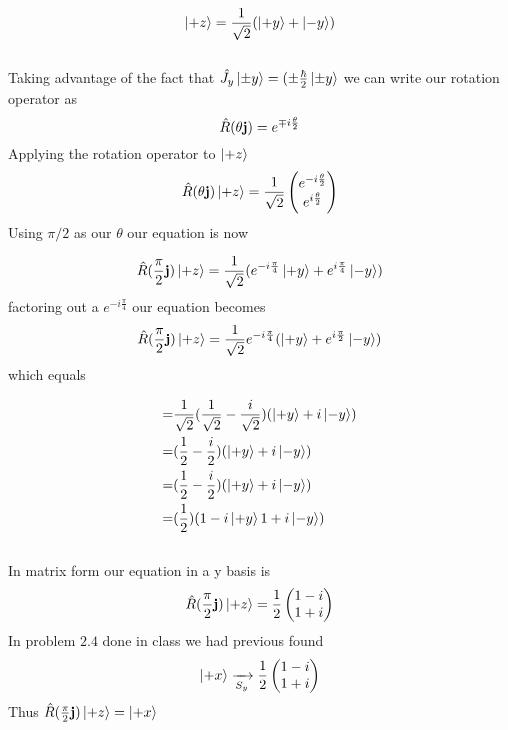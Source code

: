 \documentclass{article}
\begin{document}
\begin{equation}
\ket{+z}=\frac{1}{\sqrt{2}}(\ket{+y}+\ket{-y})
\end{equation}
\\
Taking advantage of the fact that $\hat{J_y}\ket{\pm y}=(\pm \frac{\hbar}{2}\ket{\pm y}$ we can write our rotation operator as 
$$ \hat{R} (\theta \vb{j})=e^{\mp i\frac{\theta}{2}}$$
Applying the rotation operator to $\ket{+z}$ 
\begin{equation}
\hat{R}(\theta\vb{j})\ket{+z}
=
\frac{1}{\sqrt{2}}
\begin{pmatrix}
e^{- i\frac{\theta}{2}} \\
e^{ i\frac{\theta}{2}}
\end{pmatrix}
\end{equation}
Using $\pi/2$ as our $\theta$ our equation is now

\begin{equation}
\hat{R}(\frac{\pi}{2}\vb{j})\ket{+z}
=
\frac{1}{\sqrt{2}}(e^{- i\frac{\pi}{4}}\ket{+y}+e^{ i\frac{\pi}{4}}\ket{-y})
\end{equation}
factoring out a $e^{- i\frac{\pi}{4}}$ our equation becomes
\begin{equation}
\hat{R}(\frac{\pi}{2}\vb{j})\ket{+z}
=
\frac{1}{\sqrt{2}}e^{- i\frac{\pi}{4}}(\ket{+y}+e^{ i\frac{\pi}{2}}\ket{-y})
\end{equation}
which equals 

\begin{align}
=&\frac{1}{\sqrt{2}}(\frac{1}{\sqrt{2}}-\frac{i}{\sqrt{2}})(\ket{+y}+i\ket{-y})
\\
=&(\frac{1}{2}-\frac{i}{2})(\ket{+y}+i\ket{-y})
\\
=&(\frac{1}{2}-\frac{i}{2})(\ket{+y}+i\ket{-y})
\\
=&(\frac{1}{2})(1-i\ket{+y}1+i\ket{-y})
\end{align}
\\
In matrix form our equation in a y basis is 
\begin{equation}
\hat{R}(\frac{\pi}{2}\vb{j})\ket{+z}
=
\frac{1}{2}
\begin{pmatrix}
1-i  \\
1+i 
\end{pmatrix}
\end{equation}
In problem $2.4$ done in class we had previous found 
\begin{equation}
\ket{+x}
\xrightarrow[S_y]{}
\frac{1}{2}
\begin{pmatrix}
1-i  \\
1+i 
\end{pmatrix}
\end{equation}
Thus  $\hat{R}(\frac{\pi}{2}\vb{j})\ket{+z}=\ket{+x}$
\end{document}
